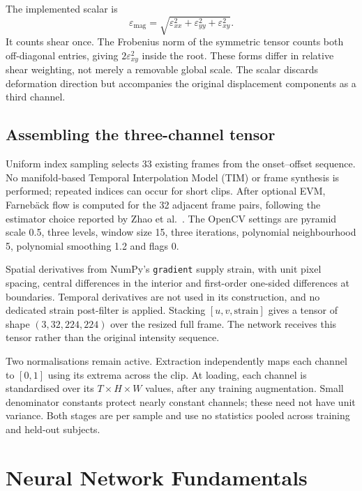 The implemented scalar is
\[
    \varepsilon_{\mathrm{mag}}
       =\sqrt{\varepsilon_{xx}^2+\varepsilon_{yy}^2
                    +\varepsilon_{xy}^2}.
\]
It counts shear once. The Frobenius norm of the symmetric tensor counts both off-diagonal entries, giving $2\varepsilon_{xy}^2$ inside the root. These forms differ in relative shear weighting, not merely a removable global scale. The scalar discards deformation direction but accompanies the original displacement components as a third channel.

\subsection{Assembling the three-channel tensor}
\label{sec:three-channel-tensor}

Uniform index sampling selects 33 existing frames from the onset--offset sequence. No manifold-based Temporal Interpolation Model (TIM) or frame synthesis is performed; repeated indices can occur for short clips. After optional EVM, Farneb\"ack flow is computed for the 32 adjacent frame pairs, following the estimator choice reported by Zhao et al.~\cite{zhaoS2021}. The OpenCV settings are pyramid scale 0.5, three levels, window size 15, three iterations, polynomial neighbourhood 5, polynomial smoothing 1.2 and flags 0.

Spatial derivatives from NumPy's \texttt{gradient} supply strain, with unit pixel spacing, central differences in the interior and first-order one-sided differences at boundaries. Temporal derivatives are not used in its construction, and no dedicated strain post-filter is applied. Stacking $[u,v,\mathrm{strain}]$ gives a tensor of shape $(3,32,224,224)$ over the resized full frame. The network receives this tensor rather than the original intensity sequence.

Two normalisations remain active. Extraction independently maps each channel to $[0,1]$ using its extrema across the clip. At loading, each channel is standardised over its $T\times H\times W$ values, after any training augmentation. Small denominator constants protect nearly constant channels; these need not have unit variance. Both stages are per sample and use no statistics pooled across training and held-out subjects.

\section{Neural Network Fundamentals}
\label{sec:nn-fundamentals}

